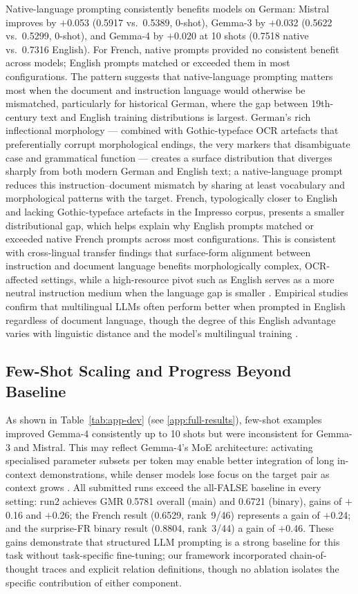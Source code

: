 \documentclass[
]{ceurart}
\theoremstyle{definition}
\begin{document}
Native-language prompting consistently benefits models on German: Mistral improves by $+$0.053 (0.5917 vs.\ 0.5389, 0-shot), Gemma-3 by $+$0.032 (0.5622 vs.\ 0.5299, 0-shot), and Gemma-4 by $+$0.020 at 10 shots (0.7518 native vs.\ 0.7316 English).
For French, native prompts provided no consistent benefit across models; English prompts matched or exceeded them in most configurations.
The pattern suggests that native-language prompting matters most when the document and instruction language would otherwise be mismatched, particularly for historical German, where the gap between 19th-century text and English training distributions is largest.
German's rich inflectional morphology --- combined with Gothic-typeface OCR artefacts that preferentially corrupt morphological endings, the very markers that disambiguate case and grammatical function --- creates a surface distribution that diverges sharply from both modern German and English text; a native-language prompt reduces this instruction--document mismatch by sharing at least vocabulary and morphological patterns with the target.
French, typologically closer to English and lacking Gothic-typeface artefacts in the Impresso corpus, presents a smaller distributional gap, which helps explain why English prompts matched or exceeded native French prompts across most configurations.
This is consistent with cross-lingual transfer findings that surface-form alignment between instruction and document language benefits morphologically complex, OCR-affected settings, while a high-resource pivot such as English serves as a more neutral instruction medium when the language gap is smaller \citep{ali2025multilingual,etxaniz2024multilingual}.
Empirical studies confirm that multilingual LLMs often perform better when prompted in English regardless of document language, though the degree of this English advantage varies with linguistic distance and the model's multilingual training \citep{etxaniz2024multilingual,mondshine2025beyond}.

\subsection{Few-Shot Scaling and Progress Beyond Baseline}

As shown in Table~\ref{tab:app-dev} (see \ref{app:full-results}), few-shot examples improved Gemma-4 consistently up to 10 shots but were inconsistent for Gemma-3 and Mistral.
This may reflect Gemma-4's MoE architecture: activating specialised parameter subsets per token may enable better integration of long in-context demonstrations, while denser models lose focus on the target pair as context grows \citep{deepseek2024deepseekmoe,wang-etal-2024-scaling}.
All submitted runs exceed the all-FALSE baseline in every setting: run2 achieves GMR 0.5781 overall (main) and 0.6721 (binary), gains of $+$0.16 and $+$0.26; the French result (0.6529, rank~9/46) represents a gain of $+$0.24; and the surprise-FR binary result (0.8804, rank~3/44) a gain of $+$0.46.
These gains demonstrate that structured LLM prompting is a strong baseline for this task without task-specific fine-tuning; our framework incorporated chain-of-thought traces and explicit relation definitions, though no ablation isolates the specific contribution of either component.
\end{document}
